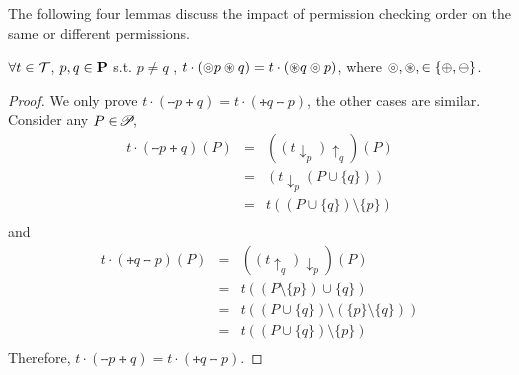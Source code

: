 {{{The following four lemmas discuss the impact of permission checking order on the same or different permissions.

\begin{lemma}\label{lem:traceorder}
$\forall t\in\mathcal{T}$, $p,q\in\mathbf{P}$ s.t. $ p\neq q$ , $t \cdot (\circledcirc p \circledast q) =  t \cdot (\circledast q  \circledcirc p) $, where $\circledcirc ,\circledast , \in\{\oplus ,\ominus \}$.
\end{lemma}
\begin{proof}
We only prove $t\cdot(\tminus{p} \tplus{ q})=t\cdot (\tplus{ q} \tminus{ p})$, the other cases are similar.
Consider any $P\in\!\mathscr{P}\!$,
\begin{equation*}
\begin{array}{lcl}
	 t\cdot(\tminus{p} \tplus{ q})(P)
	 &=&((t\downarrow_{p})\uparrow_{q})(P)\\
	 &=&(t\downarrow_{p}(P\cup\{q\}))\\
	 &=&t((P\cup\{q\})\setminus\{p\})\\
\end{array}
\end{equation*}
and
\begin{equation*}
\begin{array}{lcl}
t\cdot(\tplus{ q} \tminus{ p})(P)
	&=&((t\uparrow_{q})\downarrow_{p})(P)\\
	&=&t((P\setminus\{p\})\cup \{q\})\\
	&=&t((P\cup\{q\})\setminus(\{p\}\setminus\{q\}))\\
	&=&t((P\cup\{q\})\setminus\{p\})\\
\end{array}
\end{equation*}
Therefore, $t\cdot(\tminus{ p} \tplus{ q})=t\cdot(\tplus{ q} \tminus{ p})$.
\end{proof}

}}}
